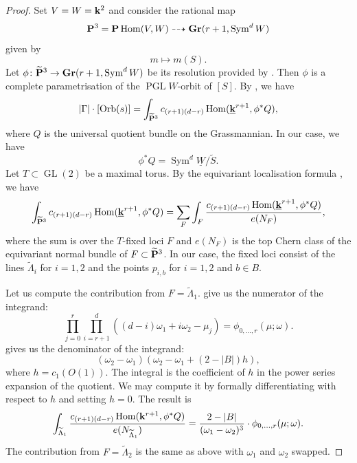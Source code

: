 \documentclass[11pt]{amsart}
\renewcommand {\P}{{\bf P}}
\providecommand {\Gr}{{\bf Gr}}
\providecommand{\GL}{\operatorname{GL}}
\providecommand{\PGL}{\operatorname{PGL}}
\providecommand{\Hom}{\operatorname{Hom}}
\providecommand{\Sym}{\operatorname{Sym}}
\DeclareMathOperator{\Orb}{Orb}
\begin{document}
\begin{proof}
  Set \(V = W = \mathbf k^2\) and consider the rational map
  \[ \P^3 = \P\Hom(V,W) \dashrightarrow \Gr(r+1, \Sym^d W)\]
  given by
  \[ m \mapsto m(S).\]
  Let \(\phi \colon \widetilde{\P}^3 \to \Gr(r+1, \Sym^dW)\) be its resolution provided by .
  Then \(\phi\) is a complete parametrisation of the \(\PGL W\)-orbit of \([S]\).
  By , we have
  \[ |\Gamma| \cdot [\Orb(s)] = \int_{\widetilde{\P}^3}c_{(r+1)(d-r)}\Hom(\underline \k^{r+1}, \phi^*Q),\]
  where \(Q\) is the universal quotient bundle on the Grassmannian.
  In our case, we have
  \[ \phi^* Q = \Sym^d \underline W / \widetilde{S}.\]
  Let \(T \subset \GL(2)\) be a maximal torus.
  By the equivariant localisation formula \cite[Corollary~1]{edi.gra:98*1}, we have
  \begin{equation}\label{eq:loc}
    \int_{\widetilde{\P}^3}c_{(r+1)(d-r)}\Hom(\underline \k^{r+1}, \phi^*Q) = \sum_F \int_F \frac{c_{(r+1)(d-r)}\Hom(\underline \k^{r+1}, \phi^*Q)}{e(N_F)},
  \end{equation}
  where the sum is over the \(T\)-fixed loci \(F\) and \(e(N_F)\) is the top Chern class of the equivariant normal bundle of \(F \subset \widetilde{\P}^3\).
  In our case, the fixed loci consist of the lines \(\widetilde \Lambda_i\) for \(i = 1, 2\) and the points \(p_{i,b}\) for \(i = 1,2\) and \(b \in B\).

  Let us compute the contribution from \(F = \widetilde\Lambda_1\).
   give us the numerator of the integrand:
  \[
    \prod_{j = 0}^r \prod_{i = r+1}^d ((d-i)\omega_1 + i \omega_2 - \mu_j) = \phi_{0,\dots,r}(\mu;\omega).
  \]
   gives us the denominator of the integrand:
  \[
    (\omega_2-\omega_1)(\omega_2-\omega_1+ (2-|B|)h),
  \]
  where \(h = c_1(O(1))\).
  The integral is the coefficient of \(h\) in the power series expansion of the quotient.
  We may compute it by formally differentiating with respect to \(h\) and setting \(h = 0\).
  The result is
  \begin{equation}\label{eq:intl}
    \int_{\widetilde{\Lambda}_1} \frac{c_{(r+1)(d-r)}\Hom(\k^{r+1},\phi^*Q)}{e(N_{\widetilde{\Lambda}_1})} =  \frac{2-|B|}{(\omega_1-\omega_2)^3} \cdot \phi_{0, \dots, r}(\mu;\omega).
  \end{equation}
  The contribution from \(F = \widetilde\Lambda_2\) is the same as above with \(\omega_1\) and \(\omega_2\) swapped.


\end{proof}
\end{document}

